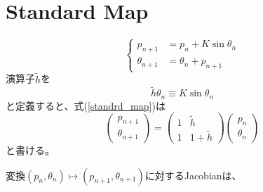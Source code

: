 \documentclass[]{jlreq}
\begin{document}
\section{Standard Map}
%
\begin{equation}
    \left\{
    \begin{aligned}
        p_{n+1} &= p_n + K\sin\theta_n \\
        \theta_{n+1} &= \theta_n + p_{n+1}
        \label{standrd_map}
    \end{aligned}
    \right.
\end{equation}
%
演算子$\tilde{h}$を
%
\begin{equation}
    \tilde{h}\theta_n \equiv K \sin\theta_n
\end{equation}
%
と定義すると、式(\ref{standrd_map})は
%
\begin{equation}
    \begin{pmatrix}
        p_{n+1}\\
        \theta_{n+1}
    \end{pmatrix}
    =
    \begin{pmatrix}
        1 & \tilde{h} \\
        1 & 1+\tilde{h}
    \end{pmatrix}
    \begin{pmatrix}
        p_n \\
        \theta_n
    \end{pmatrix}
\end{equation}
%
と書ける。

変換$(p_n, \theta_n)\mapsto (p_{n+1}, \theta_{n+1})$に対するJacobianは、
\end{document}
